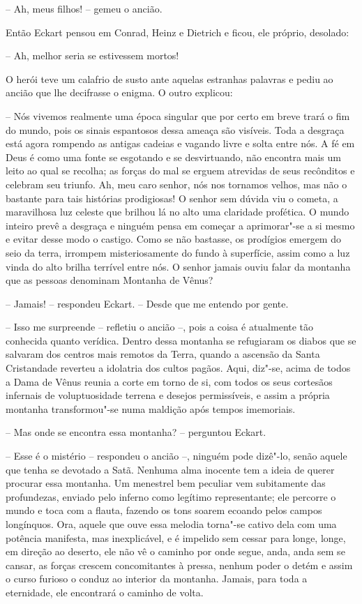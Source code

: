 -- Ah, meus filhos! -- gemeu o ancião.

Então Eckart pensou em Conrad, Heinz e Dietrich e ficou, ele próprio, desolado:	

-- Ah, melhor seria se estivessem mortos!
 
O herói teve um calafrio de susto ante aquelas estranhas palavras e
pediu ao ancião que lhe decifrasse o enigma. O outro explicou:

-- Nós vivemos realmente uma época singular que por certo em breve trará o
fim do mundo, pois os sinais espantosos dessa ameaça são visíveis. Toda
a desgraça está agora rompendo as antigas cadeias e vagando livre e
solta entre nós. A fé em Deus é como uma fonte se esgotando e se
desvirtuando, não encontra mais um leito ao qual se recolha; as forças
do mal se erguem atrevidas de seus recônditos e celebram seu triunfo.
Ah, meu caro senhor, nós nos tornamos velhos, mas não o bastante para
tais histórias prodigiosas! O senhor sem dúvida viu o cometa, a
maravilhosa luz celeste que brilhou lá no alto uma claridade profética.
O mundo inteiro prevê a desgraça e ninguém pensa em começar a
aprimorar"-se a si mesmo e evitar desse modo o castigo. Como se não
bastasse, os prodígios emergem do seio da terra, irrompem
misteriosamente do fundo à superfície, assim como a luz vinda do alto
brilha terrível entre nós. O senhor jamais ouviu falar da montanha que
as pessoas denominam Montanha de Vênus?

-- Jamais! -- respondeu Eckart. -- Desde que me entendo por gente.

-- Isso me surpreende -- refletiu o ancião --, pois a coisa é atualmente tão
conhecida quanto verídica. Dentro dessa montanha se refugiaram os
diabos que se salvaram dos centros mais remotos da Terra, quando a
ascensão da Santa Cristandade reverteu a idolatria dos cultos pagãos.
Aqui, diz"-se, acima de todos a Dama de Vênus reunia a corte em torno de
si, com todos os seus cortesãos infernais de voluptuosidade terrena e
desejos permissíveis, e assim a própria montanha transformou"-se numa
maldição após tempos imemoriais.

-- Mas onde se encontra essa montanha? -- perguntou Eckart.

-- Esse é o mistério -- respondeu o ancião --, ninguém pode dizê"-lo, senão
aquele que tenha se devotado a Satã. Nenhuma alma inocente tem a
ideia de querer procurar essa montanha. Um menestrel bem peculiar vem
subitamente das profundezas, enviado pelo inferno como legítimo
representante; ele percorre o mundo e toca com a flauta, fazendo os
tons soarem ecoando pelos campos longínquos. Ora, aquele que ouve essa
melodia torna"-se cativo dela com uma potência manifesta, mas
inexplicável, e é impelido sem cessar para longe, longe, em direção ao
deserto, ele não vê o caminho por onde segue, anda, anda sem se cansar,
as forças crescem concomitantes à pressa, nenhum poder o detém e assim o
curso furioso o conduz ao interior da montanha. Jamais, para toda a
eternidade, ele encontrará o caminho de volta.

